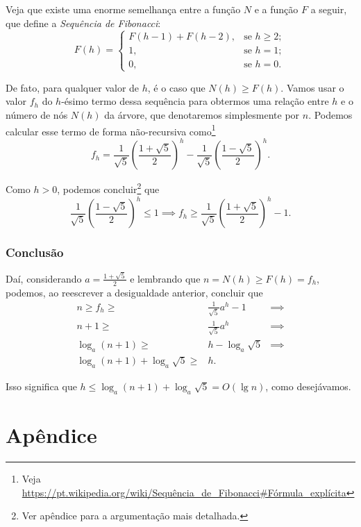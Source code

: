 \documentclass[10pt,a4paper,twoside]{article}
\theoremstyle{definition}
\begin{document}
Veja que existe uma enorme semelhança entre a função \( N \) e a função \( F \) a seguir, que define a \emph{Sequência de Fibonacci}: \[ F(h) = \begin{cases}
    F(h-1) + F(h-2) , & \text{se } h \geq 2; \\
    1               , & \text{se } h = 1; \\
    0               , & \text{se } h = 0.
\end{cases} \]

De fato, para qualquer valor de \( h \), é o caso que \( N(h) \geq F(h) \). Vamos usar o valor \( f_h \) do \( h \)-ésimo termo dessa sequência para obtermos uma relação entre \( h \) e o número de nós \( N(h) \) da árvore, que denotaremos simplesmente por \( n \). Podemos calcular esse termo de forma não-recursiva como\footnote{Veja \url{https://pt.wikipedia.org/wiki/Sequência_de_Fibonacci\#Fórmula_explícita}} \[ f_h = \frac{1}{\sqrt{5}}\left( \frac{1 + \sqrt{5}}{2} \right)^h - \frac{1}{\sqrt{5}}\left( \frac{1 - \sqrt{5}}{2} \right)^h. \]

Como \( h > 0 \), podemos concluir\footnote{Ver apêndice para a argumentação mais detalhada.} que \[ \frac{1}{\sqrt{5}}\left( \frac{1 - \sqrt{5}}{2} \right)^h \leq 1 \implies f_h \geq \frac{1}{\sqrt{5}}\left( \frac{1 + \sqrt{5}}{2} \right)^h - 1. \]

\section{Conclusão}
Daí, considerando \( a = \frac{1 + \sqrt{5}}{2} \) e lembrando que \( n = N(h) \geq F(h) = f_h \), podemos, ao reescrever a desigualdade anterior, concluir que
\begin{eqnarray*} 
	n \geq f_h \geq & \displaystyle\frac{1}{\sqrt{5}} a^h - 1 & \implies \\
	n + 1 \geq & \displaystyle\frac{1}{\sqrt{5}} a^h & \implies \\
	\log_a (n + 1) \geq & h - \log_a \sqrt{5} & \implies \\
	\log_a (n + 1) + \log_a \sqrt{5} \geq & h.
\end{eqnarray*}

Isso significa que \( h \leq \log_a (n + 1) + \log_a \sqrt{5} = O(\lg n) \), como desejávamos.

\part*{Apêndice}
\end{document}
